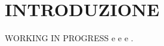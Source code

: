 \chapter*{INTRODUZIONE}
{}
WORKING IN PROGRESS \cite[vedi][]{vpmcm:code} e \cite[vedi][23]{giga:main} e
\cite[vedi][cp 3]{gui:sapiro} e \cite[vedi][cp 3-5]{fed:drag}.
